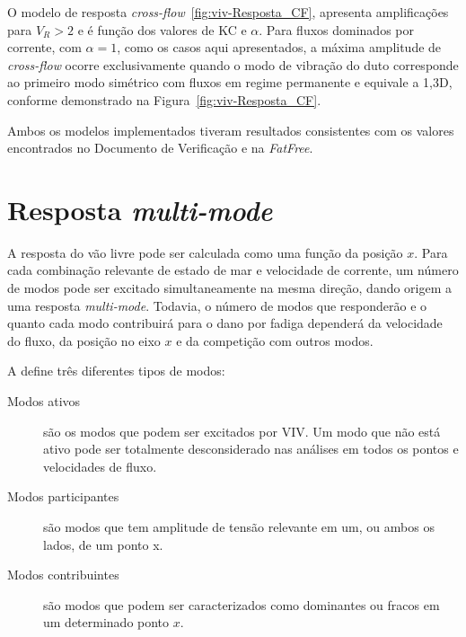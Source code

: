 O modelo de resposta \textit{cross-flow}~\ref{fig:viv-Resposta_CF}, apresenta amplificações para $V_R > 2$ e é função dos valores de KC e $\alpha$.
Para fluxos dominados por corrente, com $\alpha = 1$, como os casos aqui apresentados, a máxima amplitude de \textit{cross-flow} ocorre exclusivamente quando o modo de vibração do duto corresponde ao primeiro modo simétrico com fluxos em regime permanente e equivale a 1,3D, conforme demonstrado na Figura~\ref{fig:viv-Resposta_CF}.

Ambos os modelos implementados tiveram resultados consistentes com os valores encontrados no Documento de Verificação e na \textit{FatFree}.

\section{Resposta \textit{multi-mode}}

A resposta do vão livre pode ser calculada como uma função da posição $x$.
Para cada combinação relevante de estado de mar e velocidade de corrente, um número de modos pode ser excitado simultaneamente na mesma direção, dando origem a uma resposta \textit{multi-mode}.
Todavia, o número de modos que responderão e o quanto cada modo contribuirá para o dano por fadiga dependerá da velocidade do fluxo, da posição no eixo $x$ e da competição com outros modos.

A  define três diferentes tipos de modos:
\begin{description}
	\item[Modos ativos] são os modos que podem ser excitados por VIV.
Um modo que não está ativo pode ser totalmente desconsiderado nas análises em todos os pontos e velocidades de fluxo.

	\item[Modos participantes] são modos que tem amplitude de tensão relevante em um, ou ambos os lados, de um ponto x.

	\item [Modos contribuintes] são modos que podem ser caracterizados como dominantes ou fracos em um determinado ponto $x$. %
%
%
%
%
%

\end{description}

